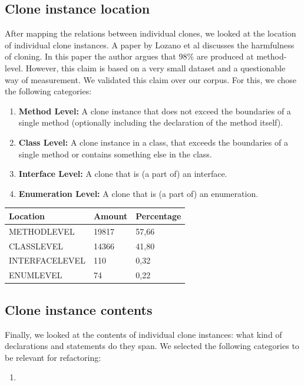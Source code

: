 \documentclass[a4paper]{article}
\begin{document}
\subsection{Clone instance location}
After mapping the relations between individual clones, we looked at the location of individual clone instances. A paper by Lozano et al \cite{lozano2007evaluating} discusses the harmfulness of cloning. In this paper the author argues that 98\% are produced at method-level. However, this claim is based on a very small dataset and a questionable way of measurement. We validated this claim over our corpus. For this, we chose the following categories:
\begin{enumerate}
  \item \textbf{Method Level:} A clone instance that does not exceed the boundaries of a single method (optionally including the declaration of the method itself).
  \item \textbf{Class Level:} A clone instance in a class, that exceeds the boundaries of a single method or contains something else in the class.
  \item \textbf{Interface Level:} A clone that is (a part of) an interface.
  \item \textbf{Enumeration Level:} A clone that is (a part of) an enumeration.
\end{enumerate}

\begin{table}[H]
\begin{tabular}{|l|l|l|}
\hline
\textbf{Location} & \textbf{Amount} & \textbf{Percentage} \\ \hline
METHODLEVEL       & 19817           & 57,66               \\ \hline
CLASSLEVEL        & 14366           & 41,80               \\ \hline
INTERFACELEVEL    & 110             & 0,32                \\ \hline
ENUMLEVEL         & 74              & 0,22                \\ \hline
\end{tabular}
\end{table}

\subsection{Clone instance contents}
Finally, we looked at the contents of individual clone instances: what kind of declarations and statements do they span. We selected the following categories to be relevant for refactoring:
\begin{enumerate}
  \item
\end{enumerate}
\end{document}
